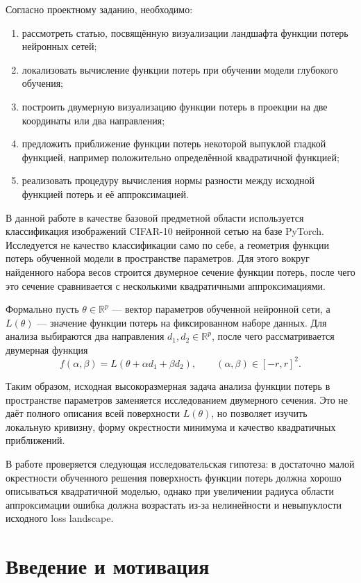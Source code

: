 \documentclass[12pt,a4paper]{article}
\begin{document}
Согласно проектному заданию, необходимо:
\begin{enumerate}
    \item рассмотреть статью, посвящённую визуализации ландшафта функции потерь нейронных сетей;
    \item локализовать вычисление функции потерь при обучении модели глубокого обучения;
    \item построить двумерную визуализацию функции потерь в проекции на две координаты или два направления;
    \item предложить приближение функции потерь некоторой выпуклой гладкой функцией, например положительно определённой квадратичной функцией;
    \item реализовать процедуру вычисления нормы разности между исходной функцией потерь и её аппроксимацией.
\end{enumerate}

В данной работе в качестве базовой предметной области используется классификация изображений CIFAR-10 нейронной сетью на базе PyTorch. Исследуется не качество классификации само по себе, а геометрия функции потерь обученной модели в пространстве параметров. Для этого вокруг найденного набора весов строится двумерное сечение функции потерь, после чего это сечение сравнивается с несколькими квадратичными аппроксимациями.

Формально пусть $\theta \in \mathbb{R}^{p}$ --- вектор параметров обученной нейронной сети, а $L(\theta)$ --- значение функции потерь на фиксированном наборе данных. Для анализа выбираются два направления $d_1, d_2 \in \mathbb{R}^{p}$, после чего рассматривается двумерная функция
\[
    f(\alpha,\beta)
    =
    L(\theta + \alpha d_1 + \beta d_2),
    \qquad
    (\alpha,\beta) \in [-r,r]^2.
\]

Таким образом, исходная высокоразмерная задача анализа функции потерь в пространстве параметров заменяется исследованием двумерного сечения. Это не даёт полного описания всей поверхности $L(\theta)$, но позволяет изучить локальную кривизну, форму окрестности минимума и качество квадратичных приближений.

В работе проверяется следующая исследовательская гипотеза: в достаточно малой окрестности обученного решения поверхность функции потерь должна хорошо описываться квадратичной моделью, однако при увеличении радиуса области аппроксимации ошибка должна возрастать из-за нелинейности и невыпуклости исходного loss landscape.

\section{Введение и мотивация}
\end{document}
